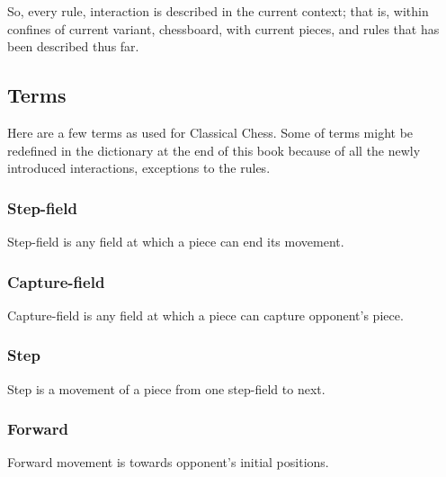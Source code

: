 
So, every rule, interaction is described in the current context; that is, within
confines of current variant, chessboard, with current pieces, and rules that has
been described thus far.

\subsection*{Terms}
\label{sec:Classical Chess/Variants/Terms}

Here are a few terms as used for Classical Chess. Some of terms might be redefined
in the dictionary at the end of this book because of all the newly introduced
interactions, exceptions to the rules.

\subsubsection*{Step-field}
\label{sec:Classical Chess/Variants/Terms/Step-field}
Step-field is any field at which a piece can end its movement.

\subsubsection*{Capture-field}
\label{sec:Classical Chess/Variants/Terms/Capture-field}
Capture-field is any field at which a piece can capture opponent's piece.

\subsubsection*{Step}
\label{sec:Classical Chess/Variants/Terms/Step}
Step is a movement of a piece from one step-field to next.

\subsubsection*{Forward}
\label{sec:Classical Chess/Variants/Terms/Forward}
Forward movement is towards opponent's initial positions.

